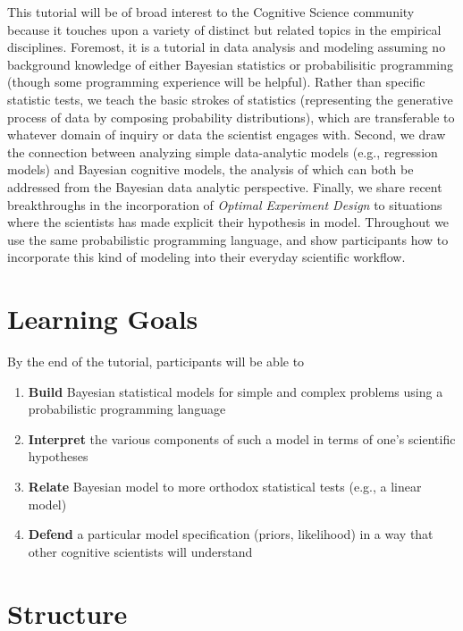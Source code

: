 \documentclass[10pt,letterpaper]{article}
\providecommand{\tightlist}{%
  \setlength{\itemsep}{0pt}\setlength{\parskip}{0pt}}
\begin{document}
This tutorial will be of broad interest to the Cognitive Science community because it touches upon a variety of distinct but related topics in the empirical disciplines. 
Foremost, it is a tutorial in data analysis and modeling assuming no background knowledge of either Bayesian statistics or probabilisitic programming (though some programming experience will be helpful). 
Rather than specific statistic tests, we teach the basic strokes of statistics (representing the generative process of data by composing probability distributions), which are transferable to whatever domain of inquiry or data the scientist engages with. 
Second, we draw the connection between analyzing simple data-analytic models (e.g., regression models) and Bayesian cognitive models, the analysis of which can both be addressed from the Bayesian data analytic perspective.
Finally, we share recent breakthroughs in the incorporation of \emph{Optimal Experiment Design} to situations where the scientists has made explicit their hypothesis in model. 
Throughout we use the same probabilistic programming language, and show participants how to incorporate this kind of modeling into their everyday scientific workflow. 



\section{Learning Goals}

By the end of the tutorial, participants will be able to 

\begin{enumerate}
\tightlist
\item \textbf{Build} Bayesian statistical models for simple and complex problems using a probabilistic programming language 
\item \textbf{Interpret} the various components of such a model in terms of one's scientific hypotheses 
\item \textbf{Relate} Bayesian model to more orthodox statistical tests (e.g., a linear model) 
\item \textbf{Defend} a particular model specification (priors, likelihood) in a way that other cognitive scientists will understand
\end{enumerate}

\section{Structure}
\end{document}
